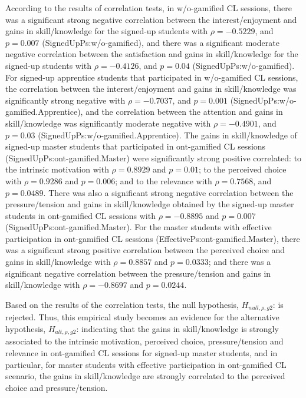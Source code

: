 According to the results of correlation tests, in w/o-gamified CL sessions, there was a significant strong negative correlation between the interest/enjoyment and gains in skill/knowledge for the signed-up students with $\rho = -0.5229$, and $p = 0.007$ (SignedUpPs:w/o-gamified), and there was a significant moderate negative correlation between the satisfaction and gains in skill/knowledge for the signed-up students with $\rho = -0.4126$, and $p = 0.04$ (SignedUpPs:w/o-gamified).
For signed-up apprentice students that participated in w/o-gamified CL sessions, the correlation between the interest/enjoyment and gains in skill/knowledge was significantly strong negative with $\rho = -0.7037$, and $p = 0.001$ (SignedUpPs:w/o-gamified.Apprentice), and the correlation between the attention and gains in skill/knowledge was significantly moderate negative with $\rho = -0.4901$, and $p = 0.03$ (SignedUpPs:w/o-gamified.Apprentice). 
The gains in skill/knowledge of signed-up master students that participated in ont-gamified CL sessions (SignedUpPs:ont-gamified.Master) were significantly strong positive correlated: to the intrinsic motivation with $\rho = 0.8929$ and $p = 0.01$; to the perceived choice with $\rho = 0.9286$ and $p = 0.006$; and to the relevance with $\rho = 0.7568$, and $p = 0.0489$.
There was also a significant strong negative correlation between the pressure/tension and gains in skill/knowledge obtained by the signed-up master students in ont-gamified CL sessions with $\rho = -0.8895$ and $p =0.007$ (SignedUpPs:ont-gamified.Master).
For the master students with effective participation in ont-gamified CL sessions (EffectivePs:ont-gamified.Master), there was a significant strong positive correlation between the perceived choice and gains in skill/knowledge with $\rho = 0.8857$ and $p = 0.0333$; and there was a significant negative correlation between the pressure/tension and gains in skill/knowledge with $\rho = -0.8697$ and $p = 0.0244$.

Based on the results of the correlation tests, the null hypothesis, $H_{null,\rho,g2}$:
 is rejected.
Thus, this empirical study becomes an evidence for the alternative hypothesis, $H_{alt,\rho,g2}$:
 indicating that the gains in skill/knowledge is strongly associated to the intrinsic motivation, perceived choice, pressure/tension and relevance in ont-gamified CL sessions for signed-up master students, and in particular, for master students with effective participation in ont-gamified CL scenario, the gains in skill/knowledge are strongly correlated to the perceived choice and pressure/tension.

